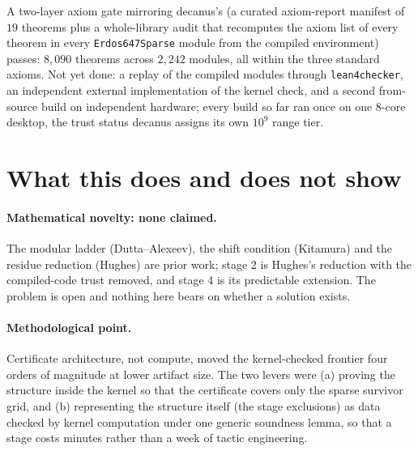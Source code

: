 \documentclass[11pt]{article}
\begin{document}
\begin{center}
\end{center}

A two-layer axiom gate mirroring decanus's (a curated axiom-report manifest of $19$ theorems plus a whole-library audit that recomputes the axiom list of every theorem in every \texttt{Erdos647Sparse} module from the compiled environment) passes: $8{,}090$ theorems across $2{,}242$ modules, all within the three standard axioms. Not yet done: a replay of the compiled modules through \texttt{lean4checker}, an independent external implementation of the kernel check, and a second from-source build on independent hardware; every build so far ran once on one 8-core desktop, the trust status decanus assigns its own $10^{9}$ range tier.

\section{What this does and does not show}\label{sec:limits}

\paragraph{Mathematical novelty: none claimed.} The modular ladder (Dutta--Alexeev), the shift condition (Kitamura) and the residue reduction (Hughes) are prior work; stage 2 is Hughes's reduction with the compiled-code trust removed, and stage 4 is its predictable extension. The problem is open and nothing here bears on whether a solution exists.

\paragraph{Methodological point.} Certificate architecture, not compute, moved the kernel-checked frontier four orders of magnitude at lower artifact size. The two levers were (a) proving the structure inside the kernel so that the certificate covers only the sparse survivor grid, and (b) representing the structure itself (the stage exclusions) as data checked by kernel computation under one generic soundness lemma, so that a stage costs minutes rather than a week of tactic engineering.
\end{document}
